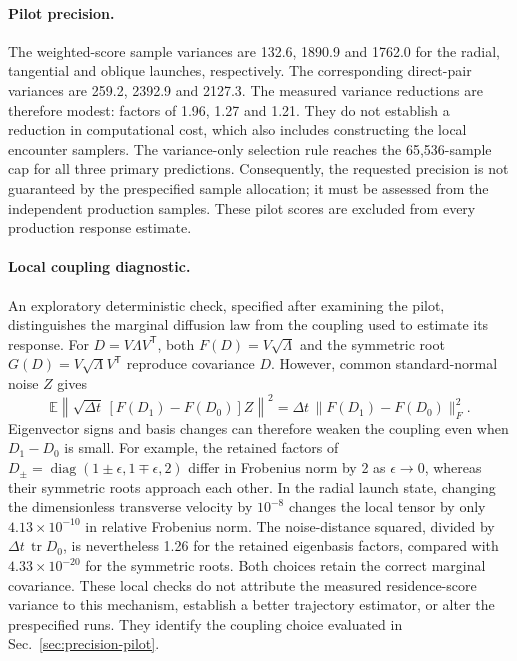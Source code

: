 \documentclass[aps,prd,reprint,amsmath,amssymb,superscriptaddress,nofootinbib,longbibliography,floatfix]{revtex4-2}
\begin{document}
\paragraph{Pilot precision.}
The weighted-score sample variances are 132.6, 1890.9 and 1762.0 for the radial, tangential and oblique launches, respectively. The corresponding direct-pair variances are 259.2, 2392.9 and 2127.3. The measured variance reductions are therefore modest: factors of 1.96, 1.27 and 1.21. They do not establish a reduction in computational cost, which also includes constructing the local encounter samplers. The variance-only selection rule reaches the 65,536-sample cap for all three primary predictions. Consequently, the requested precision is not guaranteed by the prespecified sample allocation; it must be assessed from the independent production samples. These pilot scores are excluded from every production response estimate.

\paragraph{Local coupling diagnostic.}
An exploratory deterministic check, specified after examining the pilot, distinguishes the marginal diffusion law from the coupling used to estimate its response. For $D=V\Lambda V^{\mathsf T}$, both $F(D)=V\sqrt{\Lambda}$ and the symmetric root $G(D)=V\sqrt{\Lambda}V^{\mathsf T}$ reproduce covariance $D$. However, common standard-normal noise $Z$ gives
\begin{equation}
\mathbb E\left\|\sqrt{\Delta t}\,[F(D_1)-F(D_0)]Z\right\|^2
=\Delta t\,\|F(D_1)-F(D_0)\|_F^2.
\label{eq:coupling-noise-distance}
\end{equation}
Eigenvector signs and basis changes can therefore weaken the coupling even when $D_1-D_0$ is small. For example, the retained factors of $D_\pm=\operatorname{diag}(1\pm\epsilon,1\mp\epsilon,2)$ differ in Frobenius norm by 2 as $\epsilon\to0$, whereas their symmetric roots approach each other. In the radial launch state, changing the dimensionless transverse velocity by $10^{-8}$ changes the local tensor by only $4.13\times10^{-10}$ in relative Frobenius norm. The noise-distance squared, divided by $\Delta t\,\operatorname{tr}D_0$, is nevertheless 1.26 for the retained eigenbasis factors, compared with $4.33\times10^{-20}$ for the symmetric roots. Both choices retain the correct marginal covariance. These local checks do not attribute the measured residence-score variance to this mechanism, establish a better trajectory estimator, or alter the prespecified runs. They identify the coupling choice evaluated in Sec.~\ref{sec:precision-pilot}.
\end{document}

